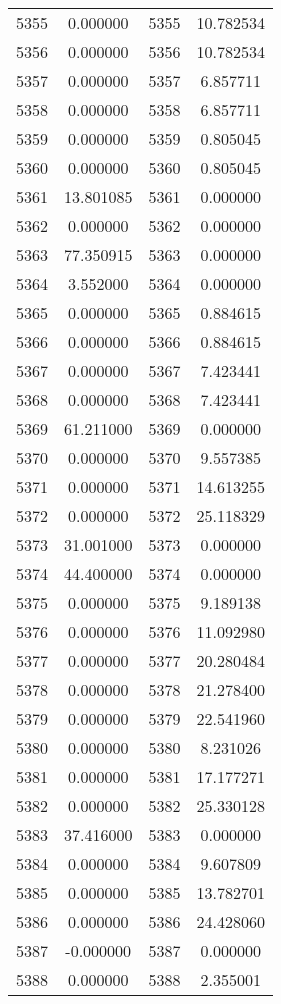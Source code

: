 \documentclass[12pt]{article}
\begin{document}
\begin{longtable}{@{}cccc@{}}
5355 & 0.000000 & 5355 & 10.782534 \\
5356 & 0.000000 & 5356 & 10.782534 \\
5357 & 0.000000 & 5357 & 6.857711 \\
5358 & 0.000000 & 5358 & 6.857711 \\
5359 & 0.000000 & 5359 & 0.805045 \\
5360 & 0.000000 & 5360 & 0.805045 \\
5361 & 13.801085 & 5361 & 0.000000 \\
5362 & 0.000000 & 5362 & 0.000000 \\
5363 & 77.350915 & 5363 & 0.000000 \\
5364 & 3.552000 & 5364 & 0.000000 \\
5365 & 0.000000 & 5365 & 0.884615 \\
5366 & 0.000000 & 5366 & 0.884615 \\
5367 & 0.000000 & 5367 & 7.423441 \\
5368 & 0.000000 & 5368 & 7.423441 \\
5369 & 61.211000 & 5369 & 0.000000 \\
5370 & 0.000000 & 5370 & 9.557385 \\
5371 & 0.000000 & 5371 & 14.613255 \\
5372 & 0.000000 & 5372 & 25.118329 \\
5373 & 31.001000 & 5373 & 0.000000 \\
5374 & 44.400000 & 5374 & 0.000000 \\
5375 & 0.000000 & 5375 & 9.189138 \\
5376 & 0.000000 & 5376 & 11.092980 \\
5377 & 0.000000 & 5377 & 20.280484 \\
5378 & 0.000000 & 5378 & 21.278400 \\
5379 & 0.000000 & 5379 & 22.541960 \\
5380 & 0.000000 & 5380 & 8.231026 \\
5381 & 0.000000 & 5381 & 17.177271 \\
5382 & 0.000000 & 5382 & 25.330128 \\
5383 & 37.416000 & 5383 & 0.000000 \\
5384 & 0.000000 & 5384 & 9.607809 \\
5385 & 0.000000 & 5385 & 13.782701 \\
5386 & 0.000000 & 5386 & 24.428060 \\
5387 & -0.000000 & 5387 & 0.000000 \\
5388 & 0.000000 & 5388 & 2.355001 \\

\end{longtable}
\end{document}

